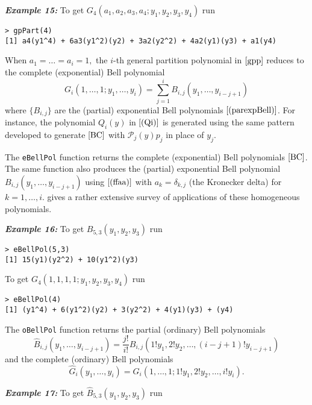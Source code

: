 \hskip-0.5cm\textbf{\emph{Example 15:}} To get
\(G_4( a_1, a_2, a_3, a_4; y_1, y_2, y_3, y_4)\) run

\begin{verbatim}
> gpPart(4)
[1] a4(y1^4) + 6a3(y1^2)(y2) + 3a2(y2^2) + 4a2(y1)(y3) + a1(y4)
\end{verbatim}

When \(a_1 = \ldots = a_i =1,\) the \(i\)-th general partition
polynomial in \(\eqref{gpp}\) reduces to the complete (exponential) Bell
polynomial \begin{equation}
G_i( 1, \ldots, 1; y_1, \ldots, y_i) =  \sum_{j=1}^i B_{i,j}(y_1, \ldots, y_{i-j+1})
\label{BC}
\end{equation} where \(\{B_{i,j}\}\) are the (partial) exponential Bell
polynomials \(\eqref{(parexpBell)}\). For instance, the polynomial
\(Q_i(y)\) in \(\eqref{(Qi)}\) is generated using the same pattern
developed to generate \(\eqref{BC}\) with \({\mathcal P}_{j}(y) p_{j}\)
in place of \(y_j.\)

The \texttt{eBellPol} function returns the complete (exponential) Bell
polynomials \(\eqref{BC}\). The same function also produces the
(partial) exponential Bell polynomial
\(B_{i,j}(y_1, \ldots, y_{i-j+1})\) using \(\eqref{(ffaa)}\) with
\(a_k=\delta_{k,j}\) (the Kronecker delta) for \(k=1, \ldots,i.\)
\citet{survey} gives a rather extensive survey of applications of these
homogeneous polynomials.

\hskip-0.5cm\textbf{\emph{Example 16:}} To get
\(B_{5,3}(y_1, y_2, y_{3})\) run

\begin{verbatim}
> eBellPol(5,3)
[1] 15(y1)(y2^2) + 10(y1^2)(y3)
\end{verbatim}

\noindent To get \(G_4(1, 1, 1, 1; y_1, y_2, y_3, y_4)\) run

\begin{verbatim}
> eBellPol(4)
[1] (y1^4) + 6(y1^2)(y2) + 3(y2^2) + 4(y1)(y3) + (y4)
\end{verbatim}

The \texttt{oBellPol} function returns the partial (ordinary) Bell
polynomials
\[\hat{B}_{i,j}(y_1, \ldots, y_{i-j+1}) = \frac{j!}{i!} B_{i,j}(1! y_1, 2! y_2, \ldots, (i-j+1)! y_{i-j+1})\]
and the complete (ordinary) Bell polynomials
\[\hat{G}_i(y_1, \ldots, y_i) =  G_i(1, \ldots, 1; 1! y_1, 2! y_2, \ldots, i! y_i).\]

\hskip-0.5cm\textbf{\emph{Example 17:}} To get
\(\hat{B}_{5,3}(y_1, y_2,y_3)\) run

